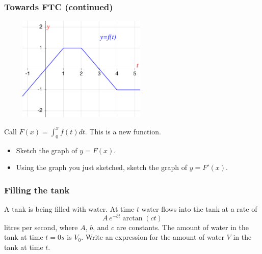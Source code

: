 \documentclass[14pt]{beamer}
\begin{document}
	\begin{frame}[t]
		\fontsize{13}{13}\selectfont
		\frametitle{Towards FTC (continued)}

		\begin{center}
			\includegraphics[width=8cm, height=5cm]{G21}
		\end{center}

		Call $\displaystyle F(x) = \int_{0}^{x}f(t) dt$. This is a new function.
		\begin{itemize}
			\item Sketch the graph of $\displaystyle y=F(x)$.

			\item Using the graph you just sketched, sketch the graph of
				$\displaystyle y=F'(x)$.
		\end{itemize}
	\end{frame}






	\begin{frame}[t]
		\frametitle{Filling the tank}

		A tank is being filled with water. At time $t$ water flows into the tank at a
		rate of
		\[
			A \, e^{-bt}\arctan (ct)
		\]
		litres per second, where $A$, $b$, and $c$ are constants. The amount of water
		in the tank at time $t=0s$ is $V_{0}$. Write an expression for the amount of
		water $V$ in the tank at time $t$.
	\end{frame}
\end{document}
